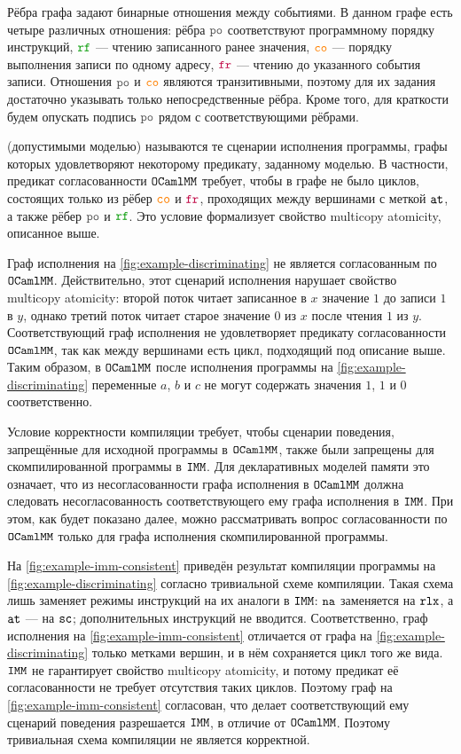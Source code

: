 Рёбра графа задают бинарные отношения между событиями. В данном графе есть четыре
различных отношения: рёбра $\lPO$ соответствуют программному порядку инструкций, $\lRF$ --- чтению записанного ранее значения, $\lCO$ --- порядку выполнения записи по одному адресу, $\lFR$ --- чтению до указанного события записи. Отношения $\lPO$ и $\lCO$ являются транзитивными, поэтому для их задания достаточно указывать только непосредственные рёбра. Кроме того, для краткости будем опускать подпись $\lPO$ рядом с соответствующими рёбрами.

 (допустимыми моделью) называются те сценарии исполнения программы, графы которых удовлетворяют некоторому предикату, заданному моделью. В частности, предикат согласованности $\mathtt{OCaml}\allowbreak \mathtt{MM}$ требует, чтобы в графе не было циклов, состоящих только из рёбер $\lCO$ и $\lFR$, проходящих между вершинами с меткой ${\mathtt{at}}$, а также рёбер $\lPO$ и $\lRF$. Это условие формализует свойство multicopy atomicity, описанное выше.

Граф исполнения на \cref{fig:example-discriminating} не является согласованным по $\mathtt{OCaml}\allowbreak \mathtt{MM}$. Действительно, этот сценарий исполнения нарушает свойство multicopy atomicity: второй поток читает записанное в $x$ значение $1$ до записи $1$ в $y$, однако третий поток читает старое значение $0$ из $x$ после чтения $1$ из $y$. Соответствующий граф исполнения не удовлетворяет предикату согласованности $\mathtt{OCaml}\allowbreak \mathtt{MM}$, так как между вершинами есть цикл, подходящий под описание выше. Таким образом, в $\mathtt{OCaml}\allowbreak \mathtt{MM}$ после исполнения программы на \cref{fig:example-discriminating} переменные $a$, $b$ и $c$ не могут содержать значения $1$, $1$ и $0$ соответственно.

Условие корректности компиляции требует, чтобы сценарии поведения, запрещённые для исходной программы в $\mathtt{OCaml}\allowbreak \mathtt{MM}$, также были запрещены для скомпилированной программы в $\mathtt{IMM}$. Для декларативных моделей памяти это означает, что из несогласованности графа исполнения в $\mathtt{OCaml}\allowbreak \mathtt{MM}$ должна следовать несогласованность соответствующего ему графа исполнения  в $\mathtt{IMM}$. При этом, как будет показано далее, можно рассматривать вопрос согласованности по $\mathtt{OCaml}\allowbreak \mathtt{MM}$ только для графа исполнения скомпилированной программы.

На \cref{fig:example-imm-consistent} приведён результат компиляции программы на \cref{fig:example-discriminating} согласно тривиальной схеме компиляции. 
Такая схема лишь заменяет режимы инструкций на их аналоги в $\mathtt{IMM}$: ${\mathtt{na}}$ заменяется на $\mathtt{rlx}$, а ${\mathtt{at}}$ — на ${\mathtt{sc}}$; дополнительных инструкций не вводится. Соответственно, граф исполнения на \cref{fig:example-imm-consistent} отличается от графа на \cref{fig:example-discriminating} только метками вершин, и в нём сохраняется цикл того же вида. $\mathtt{IMM}$ не гарантирует свойство multicopy atomicity, и потому предикат её согласованности не требует отсутствия таких циклов. Поэтому граф на \cref{fig:example-imm-consistent} согласован, что делает соответствующий ему сценарий поведения разрешается $\mathtt{IMM}$, в отличие от $\mathtt{OCaml}\allowbreak \mathtt{MM}$. Поэтому тривиальная схема компиляции не является корректной.

